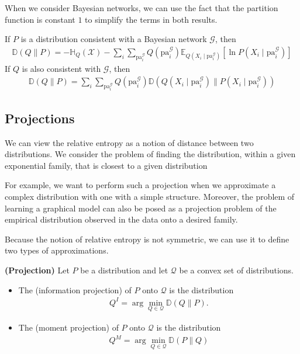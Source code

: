 \documentclass{article}
\newcommand{\bfs}[1]{\textbf{({#1}) }}
\begin{document}
When we consider Bayesian networks, we can use the fact that the partition function is constant $1$ to simplify the terms in both results.
\begin{thma}
If $P$ is a distribution consistent with a Bayesian network $\mathcal{G}$, then
\begin{align*}
\mathbb{D}(Q \| P)=-\mathbb{H}_{Q}(\mathcal{X})-\sum_{i} \sum_{\mathrm{pa}_{i}^{\mathcal{G}}} Q\left(\mathrm{pa}_{i}^{\mathcal{G}}\right) \mathbb{E}_{Q\left(X_{i} \mid \mathrm{pa}_{i}^{\mathcal{G}}\right)}\left[\ln P\left(X_{i} \mid \mathrm{pa}_{i}^{\mathcal{G}}\right)\right]
\end{align*}
If $Q$ is also consistent with $\mathcal{G}$, then
\begin{align*}
\mathbb{D}(Q \| P)=\sum_{i} \sum_{\mathrm{pa}_{i}^{\mathcal{G}}} Q\left(\mathrm{pa}_{i}^{\mathcal{G}}\right) \mathbb{D}\left(Q\left(X_{i} \mid \mathrm{pa}_{i}^{\mathcal{G}}\right) \| P\left(X_{i} \mid \mathrm{pa}_{i}^{\mathcal{G}}\right)\right)
\end{align*}
\end{thma}

\subsection{Projections}
We can view the relative entropy as a notion of distance between two distributions. We consider the problem of finding the distribution, within a given exponential family, that is closest to a given distribution

\begin{exma}
For example, we want to perform such a projection when we approximate a complex distribution with one with a simple structure. Moreover, the problem of learning a graphical model can also be posed as a projection problem of the empirical distribution observed in the data onto a desired family.
\end{exma}
 Because the notion of relative entropy is not symmetric, we can use it to define two types of approximations.
 \begin{defa}\bfs{Projection}
 Let $P$ be a distribution and let $\mathcal{Q}$ be a convex set of distributions.
 \begin{itemize}
     \item The (information projection) of $P$ onto $\mathcal{Q}$ is the distribution
\begin{align*}
Q^{I}=\arg \min _{Q \in \mathcal{Q}} \mathbb{D}(Q \| P) .
\end{align*}
\item The  (moment projection) of $P$ onto $\mathcal{Q}$ is the distribution
\begin{align*}
Q^{M}=\arg \min _{Q \in \mathcal{Q}} \mathbb{D}(P \| Q)
\end{align*}
 \end{itemize}
 \end{defa}
\end{document}
